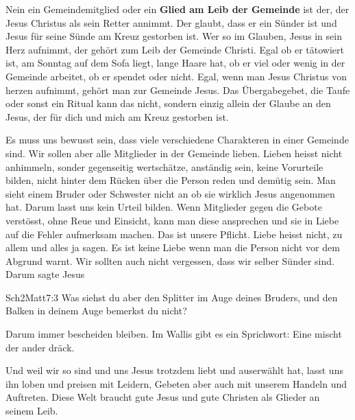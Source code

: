 \documentclass[12pt,a4paper]{scrarticle}
\begin{document}
Nein ein Gemeindemitglied oder ein \textbf{Glied am Leib der Gemeinde} ist der, der Jesus Christus
als sein Retter annimmt. Der glaubt, dass er ein Sünder ist und Jesus für seine Sünde am Kreuz
gestorben ist. Wer so im Glauben, Jesus in sein Herz aufnimmt, der gehört zum Leib der Gemeinde
Christi. Egal ob er tätowiert ist, am Sonntag auf dem Sofa liegt, lange Haare hat, ob er viel oder
wenig in der Gemeinde arbeitet, ob er spendet oder nicht. Egal, wenn man Jesus Christus von
herzen aufnimmt, gehört man zur Gemeinde Jesus. Das Übergabegebet, die Taufe oder sonst ein
Ritual kann das nicht, sondern einzig allein der Glaube an den Jesus, der für dich und mich am
Kreuz gestorben ist.

Es muss uns bewusst sein, dass viele verschiedene Charakteren in einer Gemeinde sind. Wir sollen aber alle Mitglieder in der Gemeinde lieben. Lieben heisst nicht anhimmeln, sonder gegenseitig wertschätze, anständig sein, keine Vorurteile bilden, nicht hinter dem Rücken über die Person reden und demütig sein. Man sieht einem Bruder oder Schwester nicht an ob sie wirklich Jesus angenommen hat. Darum lasst uns kein Urteil bilden. Wenn Mitglieder gegen die Gebote verstösst, ohne Reue und Einsicht, kann man diese ansprechen und sie in Liebe auf die Fehler aufmerksam machen. Das ist unsere Pflicht. Liebe heisst nicht, zu allem und alles ja sagen. Es ist keine Liebe wenn man die Person nicht vor dem Abgrund warnt.
Wir sollten auch nicht vergessen, dass wir selber Sünder sind. Darum sagte Jesus

\begin{bibeltext}{Sch2}{Matt}{7:3}
    Was siehst du aber den Splitter im Auge deines Bruders, und den Balken in deinem
Auge bemerkst du nicht?
\end{bibeltext}

Darum immer bescheiden bleiben. Im Wallis gibt es ein Sprichwort: \glqq{}Eine mischt der ander dräck\grqq.

Und weil wir so sind und uns Jesus trotzdem liebt und auserwählt hat, lasst uns ihn loben und preisen mit Leidern, Gebeten aber auch mit unserem Handeln und Auftreten. Diese Welt braucht gute Jesus und gute Christen als Glieder an seinem Leib.
\end{document}
